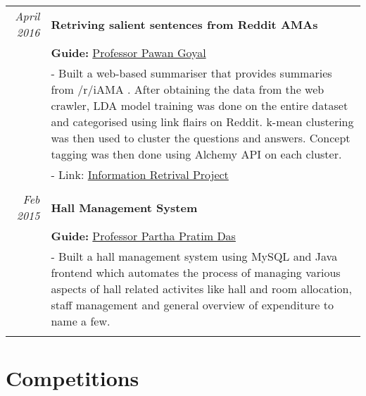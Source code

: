 \documentclass[a4paper,10pt]{article} %
\begin{document}
\begin{tabular}{r|p{15cm}}
\emph{April 2016} & \textbf{Retriving salient sentences from Reddit AMAs}\\
& \textbf{Guide: }\textmd{\href{http://cse.iitkgp.ac.in/~pawang/}{Professor Pawan Goyal}}\\
& \footnotesize{- Built a web-based summariser that provides summaries from /r/iAMA . After obtaining the data from the web crawler, LDA model training was done on the entire dataset and categorised using link flairs on Reddit. k-mean clustering was then used to cluster the questions and answers. Concept tagging was then done using Alchemy API on each cluster.}\\
& \footnotesize{- Link: \href{https://github.com/sayan1994/IR}{Information Retrival Project}}\\
\multicolumn{2}{c}{} \\

\emph{Feb 2015} & \textbf{Hall Management System}\\
& \textbf{Guide: }\textmd{\href{http://www.iitkgp.ac.in/fac-profiles/showprofile.php?empcode=SSmUZ}{Professor Partha Pratim Das}}\\
& \footnotesize{- Built a hall management system using MySQL and Java frontend which automates the process of managing various aspects of hall related activites like hall and room allocation, staff management and general overview of expenditure to name a few.}\\
\multicolumn{2}{c}{} \\
\end{tabular}

\section{Competitions}
\end{document}
